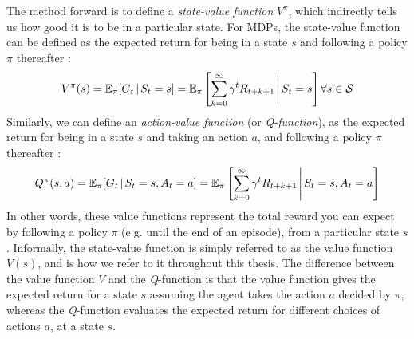 The method forward is to define a \textit{state-value function} $V^\pi$, which indirectly tells us how good it is to be in a particular state. For MDPs, the state-value function can be defined as the expected return for being in a state $s$ and following a policy $\pi$ thereafter \cite{suttonAndBartoBook}:
\begin{equation}
    V^\pi(s) = \mathbb{E}_\pi [G_t \hspace{0.5mm} | \hspace{0.5mm} S_t = s] = \mathbb{E}_\pi \left[\sum^\infty_{k=0} \gamma^t R_{t+k+1} \hspace{0.5mm} \Bigg| \hspace{0.5mm} S_t = s \right] \forall s \in \mathcal{S}
\end{equation}
Similarly, we can define an \textit{action-value function} (or \textit{Q-function}), as the expected return for being in a state $s$ and taking an action $a$, and following a policy $\pi$ thereafter \cite{suttonAndBartoBook}:
\begin{equation}
    Q^\pi(s,a) = \mathbb{E}_\pi [G_t \hspace{0.5mm} | \hspace{0.5mm} S_t = s, A_t = a] = \mathbb{E}_\pi \left[\sum^\infty_{k=0} \gamma^t R_{t+k+1} \hspace{0.5mm} \Bigg| \hspace{0.5mm} S_t = s, A_t = a \right]
\end{equation}
In other words, these value functions represent the total reward you can expect by following a policy $\pi$ (e.g. until the end of an episode), from a particular state $s$. Informally, the state-value function is simply referred to as the value function $V(s)$, and is how we refer to it throughout this thesis. The difference between the value function $V$ and the \textit{Q}-function is that the value function gives the expected return for a state $s$ assuming the agent takes the action $a$ decided by $\pi$, whereas the \textit{Q}-function evaluates the expected return for different choices of actions $a$, at a state $s$.

